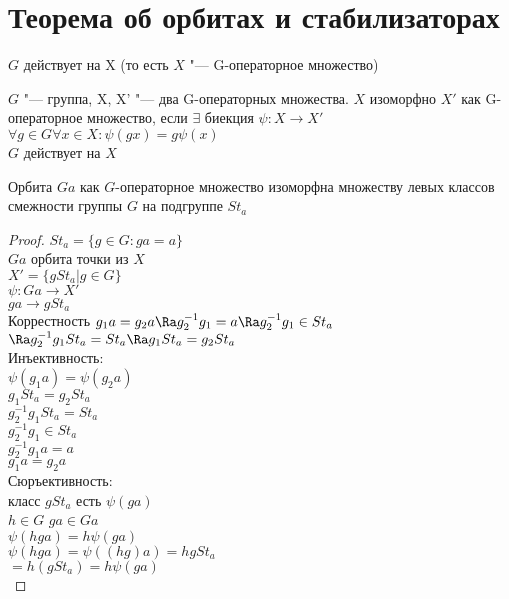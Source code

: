 ﻿\section{Теорема об орбитах и стабилизаторах}
$G$ действует на X (то есть $X$ "--- G-операторное множество)\\
\begin{Def}
$G$ "--- группа, X, X' "--- два G-операторных множества. 
$X$ изоморфно $X'$ как G-операторное множество, если 
$\exists$ биекция $\psi \colon X \to X'$\\
$\forall g \in G \forall x \in X \colon \psi(gx) = g \psi(x)$\\
$G$ действует на $X$\\
\end{Def}
\begin{theorem}
Орбита $Ga$ как $G$-операторное множество изоморфна
множеству левых классов смежности группы $G$ на подгруппе $St_a$
\end{theorem}
\begin{proof}
$St_a = \{g \in G \colon ga = a\}$\\
$Ga$ орбита точки из $X$\\
$X' = \{gSt_a | g \in G\}$\\
$\psi \colon Ga \to X'$\\
$ga \to g St_a$\\

Коррестность $g_1a  = g_2 a \Ra g_2^{-1}g_1 = a \Ra g_2^{-1}g_1 \in St_a$\\
$\Ra g_2^{-1}g_1 St_a = St_a \Ra g_1 St_a = g_2 St_a$\\

Инъективность:\\
$\psi (g_1 a) = \psi (g_2a)$\\
$g_1St_a = g_2St_a$\\
$g_2^{-1}g_1St_a = St_a$\\
$g_2^{-1}g_1 \in St_a$\\
$g_2^{-1}g_1a = a$\\
$g_1a = g_2a$\\

Сюръективность:\\
класс $gSt_a$ есть $\psi(ga)$\\
$h \in G$ $ga \in Ga$\\
$\psi(hga) = h \psi(ga)$\\
$\psi(hga) = \psi((hg)a) = hgSt_a$\\
$ = h(gSt_a) = h \psi(ga)$\\
\end{proof}
